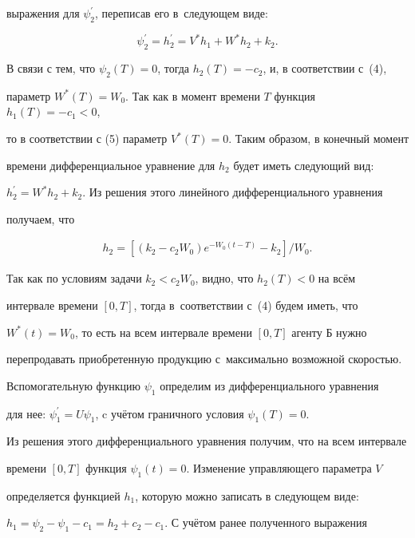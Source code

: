 выражения для $\psi^\prime _2$, переписав его в~следующем виде:

\[

\psi^\prime _2=h^\prime _2=V^*h_1+W^*h_2+k_2.

\]



В связи с тем, что $\psi_2(T)=0$, тогда $h_2(T)=-c_2$, и, в соответствии с~(4),

параметр $W^*(T)=W_0$. Так как в момент времени $T$ функция \mbox{$h_1(T)=-c_1<0$,}

то в соответствии с (5) параметр $V^*(T)=0$. Таким образом, в конечный момент

времени дифференциальное уравнение для $h_2$ будет иметь следующий вид:

$h_2^\prime=W^*h_2+k_2$. Из решения этого линейного дифференциального уравнения

получаем, что

\[

   \begin{aligned}

h_2=\left[(k_2-c_2W_0)e^{-W_0(t-T)}-k_2\right]/W_0.

   \end{aligned}

\]



Так как по условиям задачи $k_2<c_2W_0$, видно, что $h_2(T)<0$ на всём

интервале времени $[0, T]$, тогда в~соответствии с~(4) будем иметь, что

\mbox{$W^*(t)=W_0$}, то есть на всем интервале времени $[0, T]$ агенту Б нужно

перепродавать приобретенную продукцию с~максимально возможной скоростью.



Вспомогательную функцию $\psi_1$ определим из дифференциального уравнения

для нее: $\psi^\prime _1=U\psi_1$, c учётом граничного условия $\psi_1(T)=0$.

Из решения этого дифференциального уравнения получим, что на всем интервале

времени $[0, T]$ функция $\psi_1(t)=0$. Изменение управляющего параметра $V$

определяется функцией $h_1$, которую можно записать в следующем виде:

\mbox{$h_1=\psi_2-\psi_1-c_1=h_2+c_2-c_1$}. С учётом ранее полученного выражения

